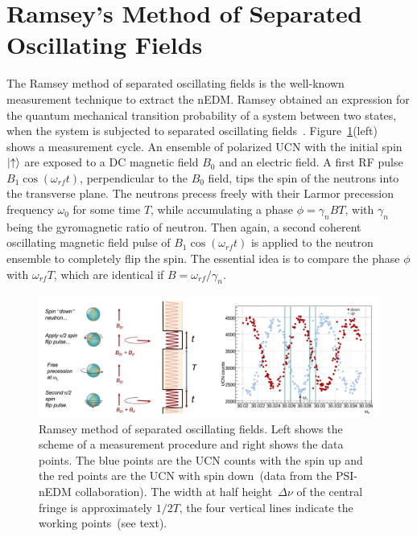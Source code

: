 \section{Ramsey's Method of Separated Oscillating
  Fields\label{sec:Ramsey}}

The Ramsey method of separated oscillating fields is the well-known
measurement technique to extract the nEDM. Ramsey obtained an
expression for the quantum mechanical transition probability of a
system between two states, when the system is subjected to separated
oscillating
fields~\cite{ramsey1950}. Figure~\ref{fig:ramsey}(left)~\cite{Schmidt2016}
shows a measurement cycle. An ensemble of polarized UCN with the
initial spin $\ket{ \uparrow}$ are exposed to a DC magnetic field
$B_0$ and an electric field. A first RF pulse
$B_1 \cos (\omega_{rf}t)$, perpendicular to the $B_0$ field, tips the
spin of the neutrons into the transverse plane. The neutrons precess
freely with their Larmor precession frequency $\omega_0$ for some time
$T$, while accumulating a phase $\phi = \gamma_n BT$, with $\gamma_n$
being the gyromagnetic ratio of neutron. Then again, a second coherent
oscillating magnetic field pulse of $B_1 \cos (\omega_{rf}t)$ is
applied to the neutron ensemble to completely flip the spin. The
essential idea is to compare the phase $\phi$ with $\omega_{rf}T$,
which are identical if $B= \omega_{rf} / \gamma_n$.

\begin{figure}[h]
  \centering
  \includegraphics[width=1.0\textwidth]{ramsey.png}
  \caption[Ramsey cycle]{\cite{Schmidt-Wellenburg:2016nfv} Ramsey
    method of separated oscillating fields. Left shows the scheme of a
    measurement procedure and right shows the data points. The blue
    points are the UCN counts with the spin up and the red points are
    the UCN with spin down~(data from the PSI-nEDM collaboration). The
    width at half height~$\Delta \nu$ of the central fringe is
    approximately $1/2T$, the four vertical lines indicate the working
    points~(see text).}
  \label{fig:ramsey}
\end{figure}


